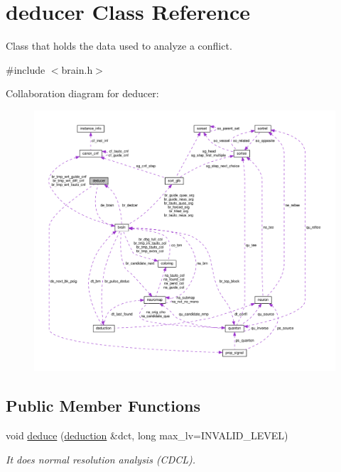 \hypertarget{classdeducer}{\section{deducer Class Reference}
\label{classdeducer}
}


Class that holds the data used to analyze a conflict.  




{\ttfamily \#include $<$brain.\+h$>$}



Collaboration diagram for deducer\+:\nopagebreak
\begin{figure}[H]
\begin{center}
\leavevmode
\includegraphics[width=350pt]{d4/d7f/classdeducer__coll__graph}
\end{center}
\end{figure}
\subsection*{Public Member Functions}
\begin{DoxyCompactItemize}
\item 
\hypertarget{classdeducer_a7db42a9dfc25ed6ed6747faea2c90961}{void \hyperlink{classdeducer_a7db42a9dfc25ed6ed6747faea2c90961}{deduce} (\hyperlink{classdeduction}{deduction} \&dct, long max\+\_\+lv=I\+N\+V\+A\+L\+I\+D\+\_\+\+L\+E\+V\+E\+L)}\label{classdeducer_a7db42a9dfc25ed6ed6747faea2c90961}

\begin{DoxyCompactList}\small\item\em It does normal resolution analysis (C\+D\+C\+L). \end{DoxyCompactList}\end{DoxyCompactItemize}


